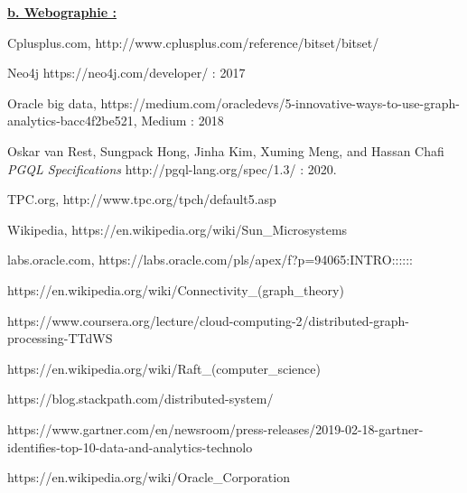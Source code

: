\textbf{ \underline{b. Webographie :} } 
\begin{enumerate}[label={[\arabic*]}]
\item{Cplusplus.com, http://www.cplusplus.com/reference/bitset/bitset/}
\item{Neo4j https://neo4j.com/developer/ : 2017}
\item{Oracle big data, https://medium.com/oracledevs/5-innovative-ways-to-use-graph-analytics-bacc4f2be521, Medium : 2018}
\item{Oskar van Rest, Sungpack Hong, Jinha Kim, Xuming Meng, and Hassan Chafi \textit{PGQL Specifications} http://pgql-lang.org/spec/1.3/ : 2020.}
\item{TPC.org, http://www.tpc.org/tpch/default5.asp}
\item{Wikipedia, https://en.wikipedia.org/wiki/Sun\_Microsystems}
\item{labs.oracle.com, https://labs.oracle.com/pls/apex/f?p=94065:INTRO::::::}
\item{https://en.wikipedia.org/wiki/Connectivity\_(graph\_theory)}
\item{https://www.coursera.org/lecture/cloud-computing-2/distributed-graph-processing-TTdWS}
\item{https://en.wikipedia.org/wiki/Raft\_(computer\_science)}
\item{https://blog.stackpath.com/distributed-system/}
\item{https://www.gartner.com/en/newsroom/press-releases/2019-02-18-gartner-identifies-top-10-data-and-analytics-technolo}
\item{https://en.wikipedia.org/wiki/Oracle\_Corporation}
\end{enumerate}\\


%




